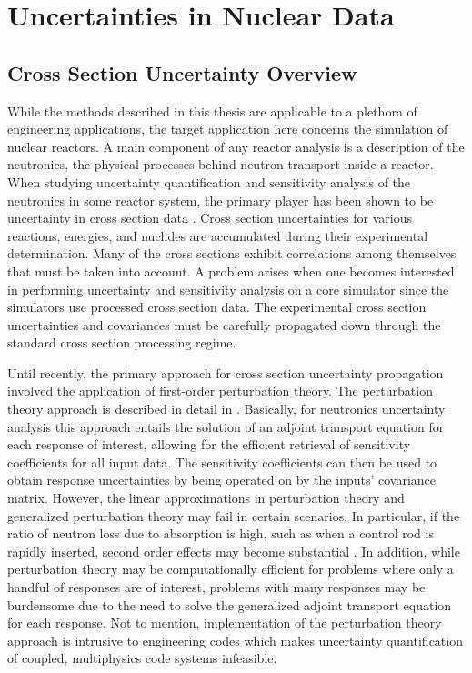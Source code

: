 \section{Uncertainties in Nuclear Data}
\label{sec:cross_sec_uncertainties}

\subsection{Cross Section Uncertainty Overview}
\label{subsec:xsec_uq_overview}

While the methods described in this thesis are applicable to a plethora of engineering applications, the target application here concerns the simulation of nuclear reactors. A main component of any reactor analysis is a description of the neutronics, the physical processes behind neutron transport inside a reactor. When studying uncertainty quantification and sensitivity analysis of the neutronics in some reactor system, the primary  player has been shown to be uncertainty in cross section data \cite{Khalik_Turinsky} \cite{Jessee_Khalik_Turinsky}. Cross section uncertainties for various reactions, energies, and nuclides are accumulated during their experimental determination. Many of the cross sections exhibit correlations among themselves that must be taken into account. A problem arises when one becomes interested in performing uncertainty and sensitivity analysis on a core simulator since the simulators use processed cross section data. The experimental cross section uncertainties and covariances must be carefully propagated down through the standard cross section processing regime.   

Until recently, the primary approach for cross section uncertainty propagation involved the application of first-order perturbation theory. The perturbation theory approach is described in detail in \cite{MLWilliams}. Basically, for neutronics uncertainty analysis this approach entails the solution of an adjoint transport equation for each response of interest, allowing for the efficient retrieval of sensitivity coefficients for all input data. The sensitivity coefficients can then be used to obtain response uncertainties by being operated on by the inputs' covariance matrix. However, the linear approximations in perturbation theory and generalized perturbation theory may fail in certain scenarios. In particular, if the ratio of neutron loss due to absorption is high, such as when a control rod is rapidly inserted, second order effects may become substantial \cite{MLWilliams}. In addition, while perturbation theory may be computationally efficient for problems where only a handful of responses are of interest, problems with many responses may be burdensome due to the need to solve the generalized adjoint transport equation for each response. Not to mention, implementation of the perturbation theory approach is intrusive to engineering codes which makes uncertainty quantification of coupled, multiphysics code systems  infeasible.         

